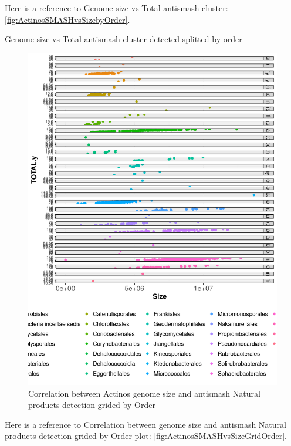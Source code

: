 \documentclass[12pt,twoside]{reedthesis}
\begin{document}
  Here is a reference to Genome size vs Total antismash cluster:
  \autoref{fig:ActinosSMASHvsSizebyOrder}. \clearpage
  
  Genome size vs Total antismash cluster detected splitted by order
  
  \begin{figure}[h!tbp]
  \centering
  \includegraphics[angle = 0,scale = 0.6]{chapter4/ActinosSMASHvsSizeGridOrder.pdf}
  \caption[Correlation between Actinos genome size and antismash Natural products detection grided by Order]{\normalsize{Correlation between Actinos genome size and antismash Natural products detection grided by Order}}
  \label{fig:ActinosSMASHvsSizeGridOrder}
  \end{figure}
  
  Here is a reference to Correlation between genome size and antismash
  Natural products detection grided by Order plot:
  \autoref{fig:ActinosSMASHvsSizeGridOrder}. \clearpage 
  
\end{document}
